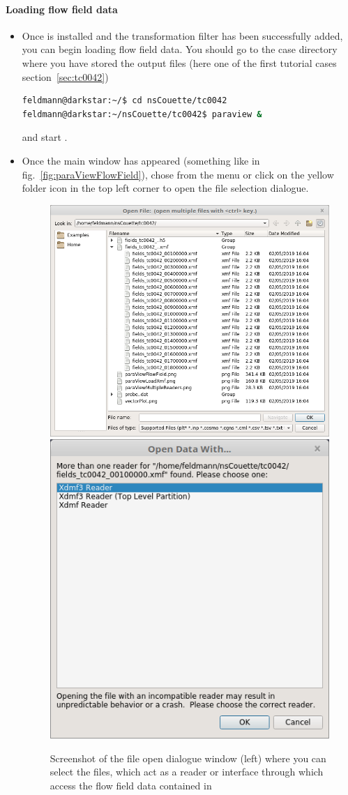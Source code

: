 \documentclass[a4paper, 11pt, DIV=11]{scrartcl}
\begin{document}
\paragraph{Loading flow field data}
\begin{itemize}
\item
Once \paraview is installed and the transformation filter has been successfully
added, you can begin loading flow field data. You should go to the case
directory where you have stored the \hdf output files (here one of the first
tutorial cases section~\ref{sec:tc0042})
\begin{lstlisting}[language=bash]
feldmann@darkstar:~/$ cd nsCouette/tc0042
feldmann@darkstar:~/nsCouette/tc0042$ paraview &
\end{lstlisting}
and start \paraview.
\item
Once the \paraview main window has appeared (something like in
fig.~\ref{fig:paraViewFlowField}), chose from the menu 
or click on the yellow folder icon in the top left corner to open the file
selection dialogue.
\begin{figure}[htb]
\centering
\includegraphics[height=0.42\linewidth]{figures/paraViewLoadXmf.png}\hfill
\includegraphics[height=0.42\linewidth]{figures/paraViewMultipleReaders.png}
\caption{Screenshot of the file open dialogue window (left) where you
can select the  files, which act as a reader or interface
through which  access the flow field data contained in
}
\end{figure}
\end{itemize}
\end{document}

